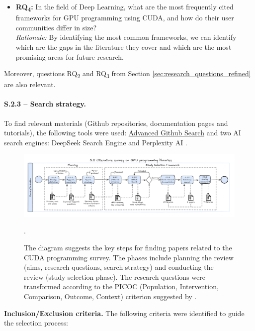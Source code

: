 \begin{itemize}
	\item \textbf{RQ\textsubscript{4}:} In the field of Deep Learning, what are the most frequently cited
	      frameworks for GPU programming using CUDA, and how do their user communities differ in size? \\
	      \textit{Rationale:} By identifying the most common frameworks, we can identify which are the gaps
	      in the literature they cover and which are the most promising areas for future research.
\end{itemize}

Moreover, questions RQ\textsubscript{2} and RQ\textsubscript{3} from Section
\ref{sec:research_questions_refined} are also relevant.

\paragraph{S.2.3 -- Search strategy.}
To find relevant materials (Github repositories, documentation pages and tutorials), the following
tools were used: \href{https://github.com/search/advanced}{Advanced Github Search} and two AI
search engines: DeepSeek Search Engine \cite{noauthor_deepseek_nodate} and Perplexity AI
\cite{noauthor_perplexity_nodate}.

\begin{figure}[th]
	\centering
	\includegraphics[width=\linewidth]{figures/survey-cuda3.pdf}
	\caption{The diagram suggests the key steps for finding papers related to the CUDA programming survey. The phases
		include planning the review (aims, research questions, search strategy) and conducting the review (study selection phase). The research questions
		were transformed according to the PICOC (Population, Intervention, Comparison, Outcome, Context) criterion suggested by \cite{keele_systematic_2007}.}.
	\label{fig:workflow-study-dnn}
\end{figure}

\textbf{Inclusion/Exclusion criteria.}
The following criteria were identified to guide the selection process:

